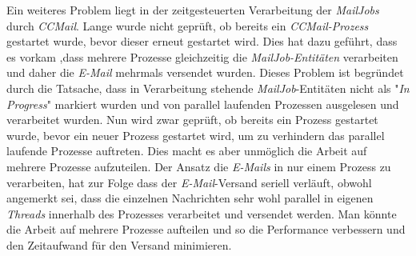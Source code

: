 \newline
\newline
Ein weiteres Problem liegt in der zeitgesteuerten Verarbeitung der \emph{MailJobs} durch \emph{CCMail}. Lange wurde nicht geprüft, ob bereits ein \emph{CCMail-Prozess} gestartet wurde, bevor dieser erneut gestartet wird. Dies hat dazu geführt, dass es vorkam ,dass mehrere Prozesse gleichzeitig die \emph{MailJob-Entitäten} verarbeiten und daher die \emph{E-Mail} mehrmals versendet wurden. Dieses Problem ist begründet durch die Tatsache, dass in Verarbeitung stehende \emph{MailJob}-Entitäten nicht als "\emph{In Progress}" markiert wurden und von parallel laufenden Prozessen ausgelesen und verarbeitet wurden. Nun wird zwar geprüft, ob bereits ein Prozess gestartet wurde, bevor ein neuer Prozess gestartet wird, um zu verhindern das parallel laufende Prozesse auftreten. Dies macht es aber unmöglich die Arbeit auf mehrere Prozesse aufzuteilen. Der Ansatz die \emph{E-Mails} in nur einem Prozess zu verarbeiten, hat zur Folge dass der \emph{E-Mail}-Versand seriell verläuft, obwohl angemerkt sei, dass die einzelnen Nachrichten sehr wohl parallel in eigenen \emph{Threads} innerhalb des Prozesses verarbeitet und versendet werden. Man könnte die Arbeit auf mehrere Prozesse aufteilen und so die Performance verbessern und den Zeitaufwand für den Versand minimieren.

